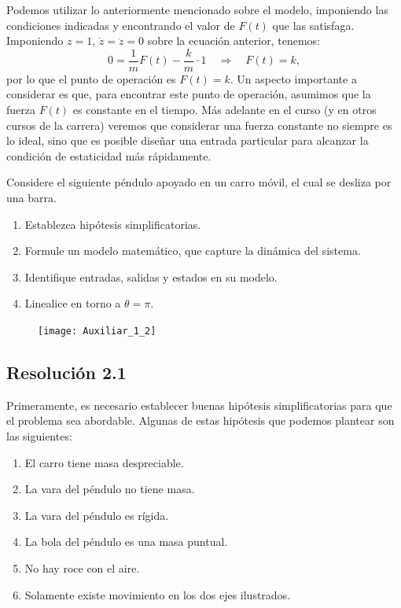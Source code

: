 \documentclass[
  11pt,
  letterpaper,
   addpoints,
   answers
  ]{exam}
\begin{document}
\begin{questions}
\begin{solution}
Podemos utilizar lo anteriormente mencionado sobre el modelo, imponiendo las condiciones indicadas y encontrando el valor de $F(t)$ que las satisfaga. Imponiendo $z = 1$, $\dot{z} = \ddot{z} = 0$ sobre la ecuación anterior, tenemos:
\begin{equation}
    0 = \frac{1}{m}F(t) - \frac{k}{m} \cdot 1 \quad \Rightarrow \quad F(t) = k,
\end{equation}
por lo que el punto de operación es $F(t) = k$. Un aspecto importante a considerar es que, para encontrar este punto de operación, asumimos que la fuerza $F(t)$ es constante en el tiempo. Más adelante en el curso (y en otros cursos de la carrera) veremos que considerar una fuerza constante no siempre es lo ideal, sino que es posible diseñar una entrada particular para alcanzar la condición de estaticidad más rápidamente.
    \end{solution}
    \question Considere el siguiente péndulo apoyado en un carro móvil, el cual se desliza por una barra.
    \begin{enumerate}
        \item Establezca hipótesis simplificatorias.
        \item Formule un modelo matemático, que capture la dinámica del sistema.
        \item Identifique entradas, salidas y estados en su modelo.
        \item Linealice en torno a $\theta = \pi$.
    \end{enumerate}
    \begin{figure}[ht]
        \centering
        \texttt{[image: Auxiliar\_1\_2]}
    \end{figure}
\begin{solution}
\subsection*{Resolución 2.1}
    Primeramente, es necesario establecer buenas hipótesis simplificatorias para que el problema sea abordable. Algunas de estas hipótesis que podemos plantear son las siguientes:
\begin{enumerate}
    \item El carro tiene masa despreciable.
    \item La vara del péndulo no tiene masa.
    \item La vara del péndulo es rígida.
    \item La bola del péndulo es una masa puntual.
    \item No hay roce con el aire.
    \item Solamente existe movimiento en los dos ejes ilustrados.
\end{enumerate}

\end{solution}
\end{questions}
\end{document}
